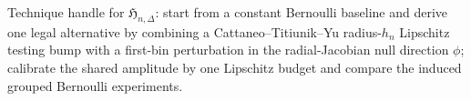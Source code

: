 Technique handle for \(\mathfrak H_{n,\Delta}\): start from a constant Bernoulli baseline and derive one legal alternative by combining a Cattaneo--Titiunik--Yu radius-\(h_n\) Lipschitz testing bump with a first-bin perturbation in the radial-Jacobian null direction \(\phi\); calibrate the shared amplitude by one Lipschitz budget and compare the induced grouped Bernoulli experiments.